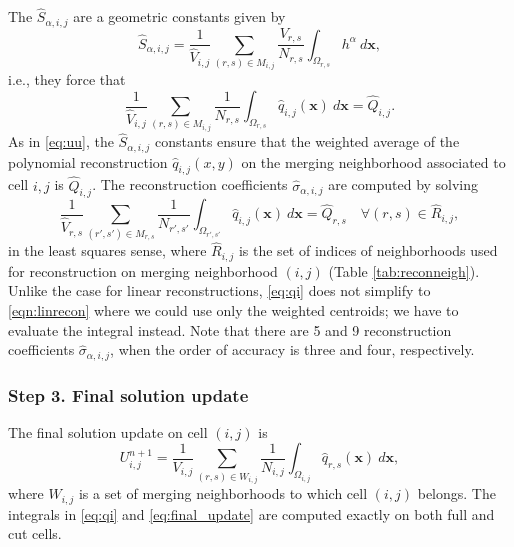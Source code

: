 The $ \widehat S_{\alpha, i,j}$ are a geometric constants given by
$$
\widehat S_{\alpha, i,j} = \frac{1}{ \widehat{V}_{i,j}} \sum_{(r,s) \in M_{i,j} }\frac{V_{r,s}}{N_{r,s}} \int_{\Omega_{r,s}} h^{\alpha}~d\mathbf{x},
$$
i.e., they force that 
\begin{equation} \label{eq:average}
\frac{1}{ \widehat{V}_{i,j}} \sum_{(r,s) \in M_{i,j} }\frac{1}{N_{r,s}} \int_{\Omega_{r,s}} \widehat{q}_{i,j}(\mathbf{x}) ~d\mathbf{x} = \widehat{Q}_{i,j}.
\end{equation}
As in \eqref{eq:uu}, the $\widehat S_{\alpha, i,j}$ constants 
ensure that the weighted average of the polynomial 
reconstruction $\widehat q_{i,j}(x,y)$ on the merging neighborhood 
associated to cell $i,j$ is $\widehat{Q}_{i,j}$.
The reconstruction coefficients $\widehat \sigma_{\alpha,i,j}$ are computed by solving
\begin{equation}\label{eq:qi}
\frac{1}{\widehat{V}_{r,s}}\sum_{(r',s') \in M_{r,s}}\frac{1}{N_{r',s'}}\int_{\Omega_{r',s'}} \widehat q_{i,j}(\mathbf{x})~d\mathbf{x} = \widehat Q_{r,s} \quad \forall (r,s) \in \widehat R_{i,j},
\end{equation}
in the least squares sense, where $\widehat R_{i,j}$ is the set of indices of neighborhoods used for reconstruction on merging neighborhood $(i,j)$ (Table \ref{tab:reconneigh}).  
Unlike the case for linear reconstructions, \eqref{eq:qi} does not
simplify to \eqref{eqn:linrecon} where we could use only the  
weighted centroids; we have to evaluate the integral instead.
Note that there are 5 and 9 reconstruction coefficients $\widehat{\sigma}_{\alpha, i,j}$, when the order of accuracy is three and four, respectively.

\subsubsection*{Step 3. Final solution update}
The final solution update on cell $(i,j)$ is
	\begin{equation}\label{eq:final_update}
	U^{n+1}_{i,j} =  \frac{1}{V_{i,j}}\sum_{(r,s) \in W_{i,j}}\frac{1}{N_{i,j}}\int_{\Omega_{i,j}} \widehat q_{r,s}(\mathbf{x})~d\mathbf{x} ,
	\end{equation}
	where $W_{i,j}$ is a set of merging neighborhoods to which cell $(i,j)$ belongs.
The integrals in \eqref{eq:qi} and \eqref{eq:final_update} are computed exactly on both full and cut cells.  

